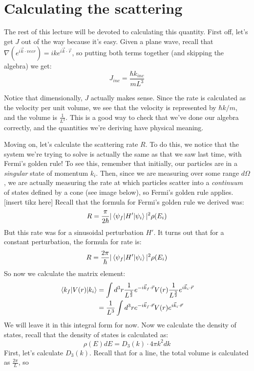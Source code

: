 \section{Calculating the scattering} 
The rest of this lecture will be devoted to calculating this quantity. First off, let's get $J$ out of the way
because it's easy. Given a plane wave, recall that $\nabla(e^{i\vec k \cdot vec r}) =
ike^{i \vec k \cdot \vec r}$, so putting both terms together (and skipping the algebra) we get: 
\[
	J_{inc} = \frac{\hbar k_{inc}}{mL^3}
\] 
\begin{insight*}{}{}
	Notice that dimensionally, $J$ actually makes sense. Since the rate is calculated as the velocity per 
	unit volume, we see that the velocity is represented by $\hbar k/m$, and the volume is $\frac{1}{L^3}$.
	This is a good way to check that we've done our algebra correctly, and the quantities we're deriving have 
	physical meaning.
\end{insight*}
Moving on, let's calculate the scattering rate $R$. To do this, we notice that the system we're trying to 
solve is actually the same as that we saw last time, with Fermi's golden rule! To see this, remember that 
initially, our particles are in a \textit{singular} state of momentum $k_i$. Then, since we are measuring 
over some range $d\Omega$, we are actually measuring the rate at which particles scatter into a \textit{
continuum} of states defined by a cone (see image below), so Fermi's golden rule applies. 
[insert tikz here]
Recall that the formula for Fermi's golden rule we derived was: 
\[
	R = \frac{\pi}{2\hbar}|\mel{\psi_f}{H'}{\psi_i}|^2 \rho(E_i)
\] 
But this rate was for a sinusoidal perturbation $H'$. It turns out that for a constant perturbation, the 
formula for rate is: 
\[
	R = \frac{2\pi}{\hbar}|\mel{\psi_f}{H'}{\psi_i}|^2 \rho(E_i)
\] 
So now we calculate the matrix element:
\begin{align*}
	\mel{k_f}{V(r)}{k_i} &= \int d^3r \frac{1}{L^{\frac{3}{2}}} e^{-i \vec k_f \cdot \vec r} V(r) \frac{1}{L^{\frac{3}{2}}} e^{i\vec k_i \cdot \vec r}\\
						 &= \frac{1}{L^3} \int d^3r e^{-i\vec k_f \cdot \vec r} V(r) 
						 e^{i\vec k_i \cdot \vec r} \\
\end{align*}
We will leave it in this integral form for now. Now we calculate the density of states, recall that the density 
of states is calculated as: 
\[
\rho(E) dE = D_3(k) \cdot 4\pi k^2 dk
\]
First, let's calculate $D_3(k)$.  
Recall that for a line, the total volume is calculated as $\frac{2\pi}{L}$, so
